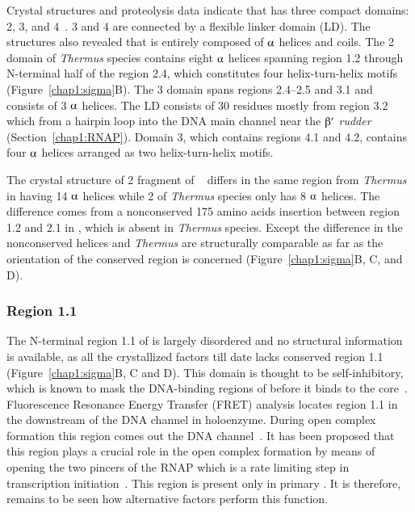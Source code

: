 Crystal structures and proteolysis data indicate that \s{} has
three compact domains: \s{}2, \s{}3, and
\s{}4~\citep[][Figure~\ref{chap1:sigma}A and B]
{Campbell2002,Murakami2002b,Vassy2002}. \s{}3 and \s{}4 are
connected by a flexible linker domain (LD). The structures also
revealed that \s{} is entirely composed of $\alphaup$ helices and
coils. The \s{}2 domain of \emph{Thermus} species contains eight
$\alphaup$ helices spanning region 1.2 through N-terminal half of
the region 2.4, which constitutes four helix-turn-helix motifs
(Figure~\ref{chap1:sigma}B). The \s{}3 domain spans regions
2.4--2.5 and 3.1 and consists of 3 $\alphaup$ helices. The LD
consists of 30 residues mostly from region 3.2 which from a
hairpin loop into the DNA main channel near the $\betaup'$
\emph{rudder} (Section~\ref{chap1:RNAP}). Domain \s{}3, which
contains regions 4.1 and 4.2, contains four $\alphaup$ helices
arranged as two helix-turn-helix motifs.


The crystal structure of \s{}2 fragment of 
\siga{}~\citep{Malhotra1996} differs in the same region from
\emph{Thermus} in having 14 $\alphaup$ helices while \s{}2 of
\emph{Thermus} species only has 8 $\alphaup$ helices. The
difference comes from a nonconserved 175 amino acids insertion
between region 1.2 and 2.1 in , which is absent in
\emph{Thermus} species.  Except the difference in the nonconserved
helices  and \emph{Thermus} \s{} are structurally
comparable as far as the orientation of the conserved region is
concerned (Figure~\ref{chap1:sigma}B, C, and D).

\subsubsection{Region 1.1}
\label{region1_1} The N-terminal region 1.1 of \s{} is largely
disordered and no structural information is available, as all the
crystallized \s{} factors till date lacks conserved region 1.1
(Figure~\ref{chap1:sigma}B, C and D). This domain is thought to be
self-inhibitory, which is known to mask the DNA-binding regions of
\s{} before it binds to the core~\citep{Dombroski1993}.
Fluorescence Resonance Energy Transfer (FRET) analysis locates
region 1.1 in the downstream of the DNA channel in holoenzyme.
During open complex formation this region comes out the DNA
channel~\citep{Mekler2002}. It has been proposed that this region
plays a crucial role in the open complex formation by means of
opening the two pincers of the RNAP which is a rate limiting step
in transcription initiation~\citep{Young2002}. This region is
present only in primary \s{}. It is therefore, remains to be seen
how alternative \s{} factors perform this function.

